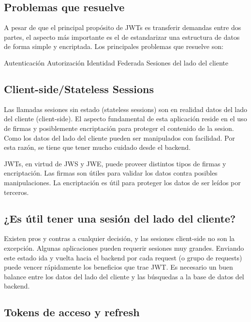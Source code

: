 \subsection[Problemas que resuelve]{Problemas que resuelve}

A pesar de que el principal propósito de JWTs es transferir demandas entre dos partes, el aspecto más importante es el de estandarizar una estructura de datos de forma simple y encriptada. 
Los principales problemas que resuelve son:
\begin{outline}
\2 Autenticación
\2 Autorización
\2 Identidad Federada
\2 Sesiones del lado del cliente
\end{outline}

\subsection[Client-side/Stateless Sessions]{Client-side/Stateless Sessions}

Las llamadas sesiones sin estado (stateless sessions) son en realidad datos del lado del cliente (client-side). El aspecto fundamental de esta aplicación reside en el uso de firmas y posiblemente encriptación para proteger el contenido de la sesion. Como los datos del lado del cliente pueden ser manipulados con facilidad. Por esta razón, se tiene que tener mucho cuidado desde el backend.

JWTs, en virtud de JWS y JWE, puede proveer distintos tipos de firmas y encriptación. Las firmas son útiles para validar los datos contra posibles manipulaciones. La encriptación es útil para proteger los datos de ser leídos por terceros.

\subsection[¿Es útil tener una sesión del lado del cliente?]{¿Es útil tener una sesión del lado del cliente?}

Existen pros y contras a cualquier decisión, y las sesiones client-side no son la excepción. Algunas aplicaciones pueden requerir sesiones muy grandes. Enviando este estado ida y vuelta hacia el backend por cada request (o grupo de requests) puede vencer rápidamente los beneficios que trae JWT. Es necesario un buen balance entre los datos del lado del cliente y las búsquedas a la base de datos del backend.

\subsection[Tokens de acceso y refresh]{Tokens de acceso y refresh}

